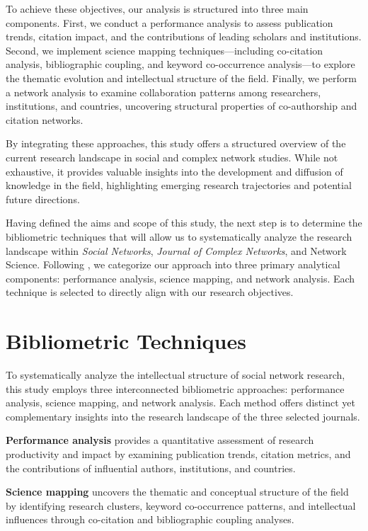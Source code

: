 \documentclass[twocolumn]{article}
\begin{document}
	To achieve these objectives, our analysis is structured into three main components. First, we conduct a performance analysis to assess publication trends, citation impact, and the contributions of leading scholars and institutions. Second, we implement science mapping techniques—including co-citation analysis, bibliographic coupling, and keyword co-occurrence analysis—to explore the thematic evolution and intellectual structure of the field. Finally, we perform a network analysis to examine collaboration patterns among researchers, institutions, and countries, uncovering structural properties of co-authorship and citation networks.
	
	By integrating these approaches, this study offers a structured overview of the current research landscape in social and complex network studies. While not exhaustive, it provides valuable insights into the development and diffusion of knowledge in the field, highlighting emerging research trajectories and potential future directions.
	
	Having defined the aims and scope of this study, the next step is to determine the bibliometric techniques that will allow us to systematically analyze the research landscape within \textit{Social Networks}, \textit{Journal of Complex Networks}, and Network Science. Following \cite{donthu_how_2021}, we categorize our approach into three primary analytical components: performance analysis, science mapping, and network analysis. Each technique is selected to directly align with our research objectives.
	
	\section{Bibliometric Techniques}\label{Bibliometric Techniques}
	
	To systematically analyze the intellectual structure of social network research, this study employs three interconnected bibliometric approaches: performance analysis, science mapping, and network analysis. Each method offers distinct yet complementary insights into the research landscape of the three selected journals.
	
	\textbf{Performance analysis} provides a quantitative assessment of research productivity and impact by examining publication trends, citation metrics, and the contributions of influential authors, institutions, and countries.
	
	\textbf{Science mapping} uncovers the thematic and conceptual structure of the field by identifying research clusters, keyword co-occurrence patterns, and intellectual influences through co-citation and bibliographic coupling analyses.
	
\end{document}
